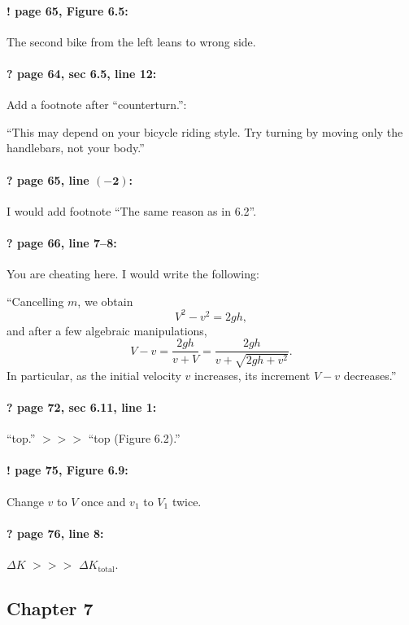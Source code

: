 \documentclass[twoside]{article}
\begin{document}
\paragraph{! page 65, Figure 6.5:} The second bike from the left leans to wrong side.

\paragraph{? page 64, sec 6.5, line 12:} Add a footnote after ``counterturn.'':

``This may depend on your bicycle riding style. Try turning by moving only the handlebars, not your body.''

\paragraph{? page 65, line $\bm{(-2)}$:} I would add footnote ``The same reason as in 6.2''.

\paragraph{? page 66, line 7--8:} You are cheating here. I would write the following:

``Cancelling $m$, we obtain
\[
V^2 - v^2 = 2gh,
\]
and after a few algebraic manipulations,
\[
V - v = \frac{2gh}{v+V} = \frac{2gh}{v+\sqrt{2gh+v^2}}.
\]
In particular, as the initial velocity $v$ increases, its increment $V - v$ decreases.''

\paragraph{? page 72, sec 6.11, line 1:} ``top.'' $>\!>\!>$  ``top (Figure 6.2).''

\paragraph{! page 75, Figure 6.9:} Change $v$ to $V$ once and $v_1$ to $V_1$ twice.

\paragraph{? page 76, line 8:} $\Delta K$ $>\!>\!>$ $\Delta K_{\mathrm{total}}$.

\subsection*{Chapter 7}
\end{document}
